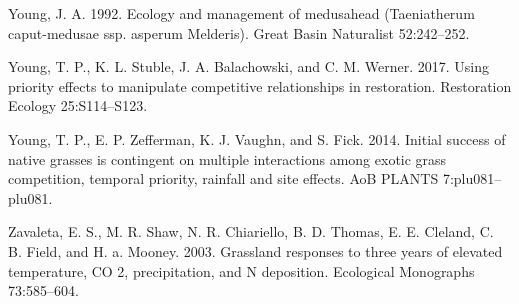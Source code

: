 \documentclass[twoside,12pt,final]{ucthesis-CA2012}
\begin{document}
\begin{ucmainmatter}
\leavevmode\hypertarget{ref-Young1992}{}%
Young, J. A. 1992. Ecology and management of medusahead (Taeniatherum caput-medusae ssp. asperum Melderis). Great Basin Naturalist 52:242--252.

\leavevmode\hypertarget{ref-Young2017}{}%
Young, T. P., K. L. Stuble, J. A. Balachowski, and C. M. Werner. 2017. Using priority effects to manipulate competitive relationships in restoration. Restoration Ecology 25:S114--S123.

\leavevmode\hypertarget{ref-Young2014}{}%
Young, T. P., E. P. Zefferman, K. J. Vaughn, and S. Fick. 2014. Initial success of native grasses is contingent on multiple interactions among exotic grass competition, temporal priority, rainfall and site effects. AoB PLANTS 7:plu081--plu081.

\leavevmode\hypertarget{ref-Zavaleta2003}{}%
Zavaleta, E. S., M. R. Shaw, N. R. Chiariello, B. D. Thomas, E. E. Cleland, C. B. Field, and H. a. Mooney. 2003. Grassland responses to three years of elevated temperature, CO 2, precipitation, and N deposition. Ecological Monographs 73:585--604.

\end{ucmainmatter}
\end{document}
